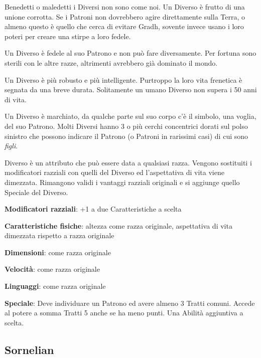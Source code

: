 \begin{multicols}{2}
Benedetti o maledetti i Diversi non sono come noi. Un Diverso è frutto di una unione corrotta. Se i Patroni non dovrebbero agire direttamente sulla Terra, o almeno questo è quello che cerca di evitare Gradh, sovente invece usano i loro poteri per creare una stirpe a loro fedele.

Un Diverso è fedele al suo Patrono e non può fare diversamente. Per fortuna sono sterili con le altre razze, altrimenti avrebbero già dominato il mondo.

Un Diverso è più robusto e più intelligente. Purtroppo la loro vita frenetica è segnata da una breve durata. Solitamente un umano Diverso non supera i 50 anni di vita.

Un Diverso è marchiato, da qualche parte sul suo corpo c'è il simbolo, una voglia, del suo Patrono. Molti Diversi hanno 3 o più cerchi concentrici dorati sul polso sinistro che possono indicare il Patrono (o Patroni in rarissimi casi) di cui sono \emph{figli}.

Diverso è un attributo che può essere data a qualsiasi razza. Vengono sostituiti i modificatori razziali con quelli del Diverso ed l'aspettativa di vita viene dimezzata. Rimangono validi i vantaggi razziali originali e si aggiunge quello Speciale del Diverso.

\textbf{Modificatori razziali}: +1 a due Caratteristiche a scelta

\textbf{Caratteristiche fisiche}: altezza come razza originale, aspettativa di vita dimezzata rispetto a razza originale

\textbf{Dimensioni}: come razza originale

\textbf{Velocità}: come razza originale

\textbf{Linguaggi}: come razza originale

\textbf{Speciale}: Deve individuare un Patrono ed avere almeno 3 Tratti comuni. Accede al potere a somma Tratti 5 anche se ha meno punti. Una Abilità aggiuntiva a scelta.

\subsection{Sornelian}\label{sornelian}\hypertarget{sornelian}{}


\end{multicols}
